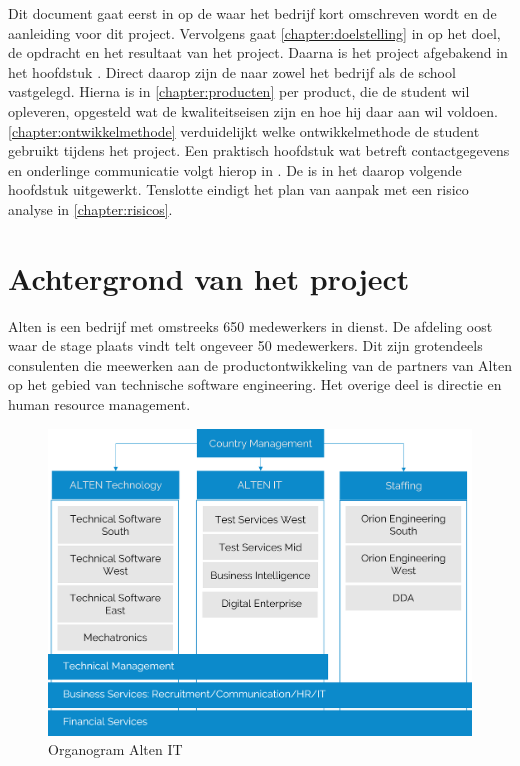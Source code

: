 \documentclass[a4paper, 11pt, oneside]{report}
\begin{document}
Dit document gaat eerst in op de  waar het bedrijf kort omschreven wordt en de aanleiding voor dit project.
Vervolgens gaat \autoref{chapter:doelstelling} in op het doel, de opdracht en het resultaat van het project.
Daarna is het project afgebakend in het hoofdstuk .
Direct daarop zijn de  naar zowel het bedrijf als de school vastgelegd.
Hierna is in \autoref{chapter:producten} per product, die de student wil opleveren, opgesteld wat de kwaliteitseisen zijn en hoe hij daar aan wil voldoen.
\autoref{chapter:ontwikkelmethode} verduidelijkt welke ontwikkelmethode de student gebruikt tijdens het project.
Een praktisch hoofdstuk wat betreft contactgegevens en onderlinge communicatie volgt hierop in .
De  is in het daarop volgende hoofdstuk uitgewerkt.
Tenslotte eindigt het plan van aanpak met een risico analyse in \autoref{chapter:risicos}.



\chapter{Achtergrond van het project}
\label{chapter:achtergrond}
Alten is een bedrijf met omstreeks 650 medewerkers in dienst.
De afdeling oost waar de stage plaats vindt telt ongeveer 50 medewerkers. 
Dit zijn grotendeels consulenten die meewerken aan de productontwikkeling van de partners van Alten op het gebied van technische software engineering.
Het overige deel is directie en human resource management.
\begin{figure}[H]
	\begin{center}\includegraphics[scale=0.25]{organogram}\end{center}
	\caption{Organogram Alten IT}
	\label{fig:organogram}
\end{figure}
\end{document}
